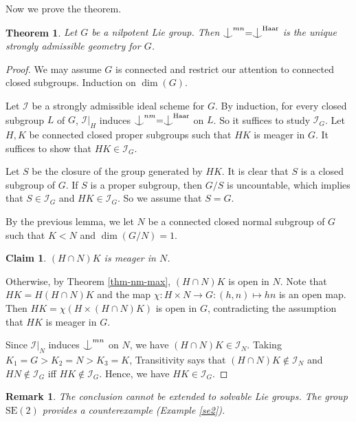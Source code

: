 \documentclass{article}
\newtheorem{theorem}[definition]{Theorem}
\newtheorem{remark}[definition]{Remark}
\newtheorem*{claim}{Claim}
\newenvironment{claimproof}[1][\proofname]
               {
                 \proof[#1]
                 \renewcommand*\qedsymbol{$\square$\rlap{\textsubscript{Claim}}}
               }
               {
                 \endproof
               }
\newcommand{\I}{\mathcal{I}}
\newcommand{\HH}{\mathrm{Haar}}
\newcommand{\ind}{\mathrel{\raise0.2ex\hbox{\ooalign{\hidewidth$\vert$\hidewidth\cr\raise-0.9ex\hbox{$\smile$}}}}}
\begin{document}
Now we prove the theorem.


\begin{theorem}\label{nil-unique}
Let $G$ be a nilpotent Lie group. Then $\ind^{mn}=\ind^\HH$ is the unique strongly admissible geometry for $G$. 
\end{theorem}
\begin{proof}
We may assume $G$ is connected and restrict our attention to connected closed subgroups. Induction on $\dim(G)$.

Let $\I$ be a strongly admissible ideal scheme for $G$. By induction, for every closed subgroup $L$ of $G$, $\I|_H$ induces $\ind^{nm}=\ind^\HH$ on $L$. So it suffices to study $\I_G$.  Let $H,K$ be connected closed proper subgroups such that $HK$ is meager in $G$. It suffices to show that $HK\in \I_G$.

Let $S$ be the closure of the group generated by $HK$. It is clear that $S$ is a closed subgroup of $G$. If $S$ is a proper subgroup, then $G/S$ is uncountable, which implies that $S\in \I_G$ and $HK\in \I_G$. So we assume that $S=G$.

By the previous lemma, we let $N$ be a  connected closed normal subgroup of $G$ such that $K<N$ and $\dim(G/N)=1$. 

\begin{claim}
$(H\cap N)K$ is meager in $N$.
\end{claim}
\begin{claimproof}
Otherwise, by Theorem \ref{thm-nm-max}, $(H\cap N)K$ is open in $N$. Note that $HK=H(H\cap N)K$ and the map $\chi: H\times N\rightarrow G:(h,n)\mapsto hn$ is an open map. Then $HK=\chi(H\times (H\cap N)K)$ is open in $G$, contradicting the assumption that $HK$ is meager in $G$.
\end{claimproof}

Since $\I|_N$ induces $\ind^{mn}$ on $N$, we have  $(H\cap N)K\in \I_N$. Taking $K_1=G>K_2=N>K_3=K$, Transitivity says that $(H\cap N)K\notin \I_N$ and $HN\notin \I_G$ iff $HK\notin \I_G$. Hence, we have $HK\in \I_G$.
\end{proof}

\begin{remark}
The conclusion cannot be extended to solvable Lie groups.  The group $\mathrm{SE}(2)$ provides a counterexample  (Example \ref{se2}). 
\end{remark}
\end{document}
